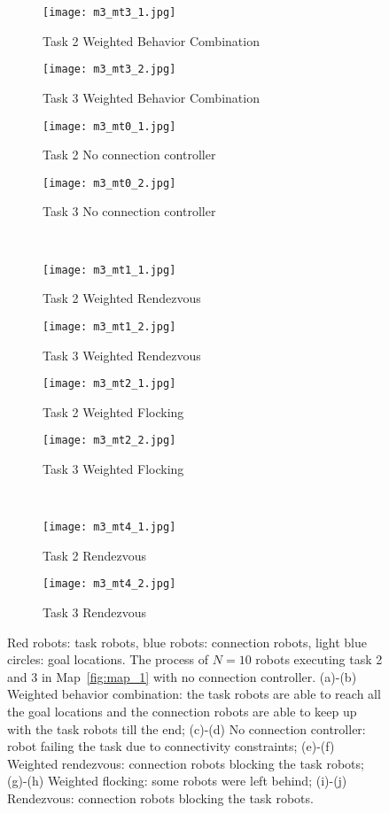 \documentclass[../main.tex]{subfiles}
\begin{document}
\begin{figure}
\centering
\begin{subfigure}[b]{0.24\textwidth}
\texttt{[image: m3\_mt3\_1.jpg]}
\caption{Task 2 Weighted Behavior Combination}
\label{fig:m3_mt3_1}
\end{subfigure}
\begin{subfigure}[b]{0.24\textwidth}
\texttt{[image: m3\_mt3\_2.jpg]}
\caption{Task 3 Weighted Behavior Combination}
\label{fig:m3_mt3_2}
\end{subfigure} \hfill
\begin{subfigure}[b]{0.24\textwidth}
\texttt{[image: m3\_mt0\_1.jpg]}
\caption{Task 2 No connection controller}
\label{fig:m3_mt0_1}
\end{subfigure}
\begin{subfigure}[b]{0.24\textwidth}
\texttt{[image: m3\_mt0\_2.jpg]}
\caption{Task 3 No connection controller}
\label{fig:m3_mt0_2}
\end{subfigure} \\
\begin{subfigure}[b]{0.24\textwidth}
\texttt{[image: m3\_mt1\_1.jpg]}
\caption{Task 2 Weighted Rendezvous}
\label{fig:m3_mt1_1}
\end{subfigure}
\begin{subfigure}[b]{0.24\textwidth}
\texttt{[image: m3\_mt1\_2.jpg]}
\caption{Task 3 Weighted Rendezvous}
\label{fig:m3_mt1_2}
\end{subfigure} \hfill
\begin{subfigure}[b]{0.24\textwidth}
\texttt{[image: m3\_mt2\_1.jpg]}
\caption{Task 2 Weighted Flocking}
\label{fig:m3_mt2_1}
\end{subfigure}
\begin{subfigure}[b]{0.24\textwidth}
\texttt{[image: m3\_mt2\_2.jpg]}
\caption{Task 3 Weighted Flocking}
\label{fig:m3_mt2_2}
\end{subfigure} \\
\begin{subfigure}[b]{0.24\textwidth}
\texttt{[image: m3\_mt4\_1.jpg]}
\caption{Task 2 Rendezvous}
\label{fig:m3_mt4_1}
\end{subfigure}
\begin{subfigure}[b]{0.24\textwidth}
\texttt{[image: m3\_mt4\_2.jpg]}
\caption{Task 3 Rendezvous}
\label{fig:m3_mt4_2}
\end{subfigure}
\caption{Red robots: task robots, blue robots: connection robots, light blue circles: goal locations. The process of $N=10$ robots executing task 2 and 3 in Map~\ref{fig:map_1} with no connection controller. (a)-(b) Weighted behavior combination: the task robots are able to reach all the goal locations and the connection robots are able to keep up with the task robots till the end; (c)-(d) No connection controller: robot failing the task due to connectivity constraints; (e)-(f) Weighted rendezvous: connection robots blocking the task robots; (g)-(h) Weighted flocking: some robots were left behind; (i)-(j) Rendezvous: connection robots blocking the task robots.}
\label{fig:m3}
\end{figure}
\end{document}
